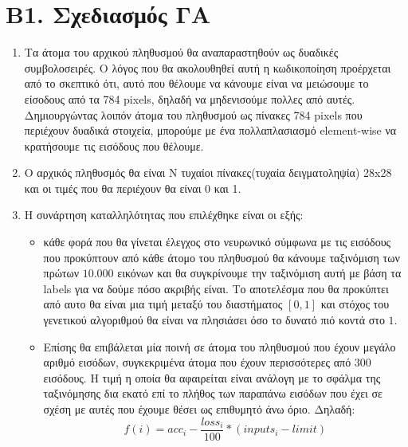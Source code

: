 \documentclass[12pt,a4paper]{article}
\newcommand{\tl}{\textlatin}
\begin{document}
        \section*{Β1. Σχεδιασμός ΓΑ}
            \begin{enumerate}
                \item Τα άτομα του αρχικού πληθυσμού θα αναπαραστηθούν ως
                    δυαδικές συμβολοσειρές. Ο λόγος που θα ακολουθηθεί αυτή η
                    κωδικοποίηση προέρχεται από το σκεπτικό ότι, αυτό που
                    θέλουμε να κάνουμε είναι να μειώσουμε το είσοδους από τα 784
                    \tl{pixels}, δηλαδή να μηδενισούμε πολλες από αυτές.
                    Δημιουργώντας λοιπόν άτομα του πληθυσμού ως πίνακες 784
                    \tl{pixels} που περιέχουν δυαδικά στοιχεία, μπορούμε με ένα
                    πολλαπλασιασμό \tl{element-wise} να κρατήσουμε τις εισόδους που
                    θέλουμε.
                \item Ο αρχικός πληθυσμός θα είναι \tl{N} τυχαίοι πίνακες(τυχαία
                    δειγματοληψία)
                    28\tl{x}28 και οι τιμές που θα περιέχουν θα είναι 0 και 1.
                \item Η συνάρτηση καταλληλότητας που επιλέχθηκε είναι οι εξής:
                    \begin{itemize}
                        
                        \item κάθε φορά που θα γίνεται έλεγχος στο νευρωνικό
                            σύμφωνα με τις εισόδους που προκύπτουν από κάθε
                            άτομο του πληθυσμού θα κάνουμε ταξινόμιση των πρώτων
                            $10.000$ εικόνων και θα συγκρίνουμε την ταξινόμιση
                            αυτή με βάση τα \tl{labels} για να δούμε πόσο
                            ακριβής είναι. Το αποτελέσμα που θα προκύπτει από
                            αυτο θα είναι μια τιμή μεταξύ του διαστήματος
                            $[0,1]$
                            και στόχος του γενετικού αλγοριθμού θα είναι να
                            πλησιάσει όσο το δυνατό πιό κοντά στο $1$.
                        \item Επίσης θα επιβάλεται μία ποινή σε άτομα του
                            πληθυσμού που έχουν μεγάλο αριθμό εισόδων,
                            συγκεκριμένα άτομα που έχουν περισσότερες από $300$
                            εισόδους. Η τιμή η οποία θα αφαιρείται είναι
                            ανάλογη με το σφάλμα της ταξινόμησης δια εκατό επί
                            το πλήθος των παραπάνω εισόδων που έχει σε σχέση με
                            αυτές που έχουμε θέσει ως επιθυμητό άνω όριο.
                            Δηλαδή:
                            $$ f(i) = acc_i - \frac{loss_i}{100}*(inputs_i - limit)$$


\end{itemize}
\end{enumerate}
\end{document}
